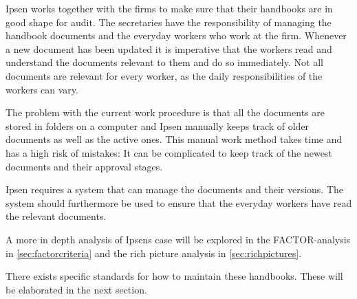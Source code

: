 Ipsen works together with the firms to make sure that their handbooks are in good shape for audit.
The secretaries have the responsibility of managing the handbook documents and the everyday workers who work at the firm.
Whenever a new document has been updated it is imperative that the workers read and understand the documents relevant to them and do so immediately.
Not all documents are relevant for every worker, as the daily responsibilities of the workers can vary.

The problem with the current work procedure is that all the documents are stored in folders on a computer and Ipsen manually keeps track of older documents as well as the active ones.
This manual work method takes time and has a high risk of mistakes:
It can be complicated to keep track of the newest documents and their approval stages.

Ipsen requires a system that can manage the documents and their versions.
The system should furthermore be used to ensure that the everyday workers have read the relevant documents.

A more in depth analysis of Ipsens case will be explored in the FACTOR-analysis in \cref{sec:factorcriteria} and the rich picture analysis in \cref{sec:richpictures}.

There exists specific standards for how to maintain these handbooks.
These will be elaborated in the next section.
